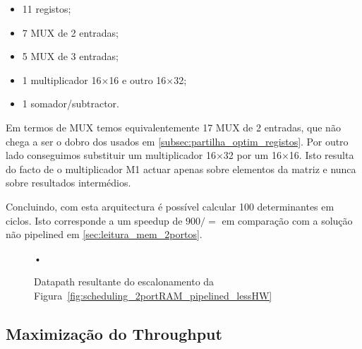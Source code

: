 \documentclass[a4paper]{article}
\begin{document}
\begin{itemize}
\item 11 registos;
\item 7 MUX de 2 entradas;
\item 5 MUX de 3 entradas;
\item 1 multiplicador 16$\times$16 e outro 16$\times$32;
\item 1 somador/subtractor.
\end{itemize}

Em termos de MUX temos equivalentemente 17 MUX de 2 entradas, que não chega a ser o dobro dos usados em \ref{subsec:partilha_optim_registos}. Por outro lado conseguimos substituir um multiplicador 16$\times$32 por um 16$\times$16. Isto resulta do facto de o multiplicador M1 actuar apenas sobre elementos da matriz e nunca sobre resultados intermédios.

Concluindo, com esta arquitectura é possível calcular 100 determinantes em $ $ ciclos. Isto corresponde a um speedup de $ 900/ = $ em comparação com a solução não pipelined em \ref{sec:leitura_mem_2portos}.

\begin{figure}[h]
\centering
•
\caption{Datapath resultante do escalonamento da Figura~\ref{fig:scheduling_2portRAM_pipelined_lessHW}}
\label{fig:datapath_pipelined_lessHW}
\end{figure}

\pagebreak
\subsection{Maximização do Throughput}
\label{subsec:arqui_2portRAM_maxthroughput}

\end{document}

